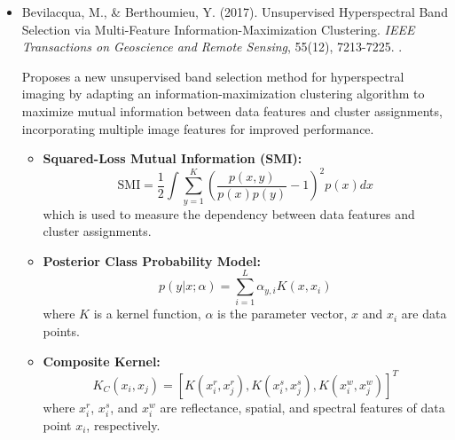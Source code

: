 \documentclass[10pt,svgnames,fragile]{beamer}
\begin{document}
\begin{frame}{}
\tiny
\begin{itemize}

    \item Bevilacqua, M., & Berthoumieu, Y. (2017). Unsupervised Hyperspectral Band Selection via Multi-Feature Information-Maximization Clustering. \textit{IEEE Transactions on Geoscience and Remote Sensing}, 55(12), 7213-7225. \href{https://doi.org/10.1109/IGARSS.2017.8127512}{\color{blue}{DOI: 10.1109/IGARSS.2017.8127512}}. \cite{bevilacquaUnsupervisedHyperspectralBand2017}
    
    {\color{gray}Proposes a new unsupervised band selection method for hyperspectral imaging by adapting an information-maximization clustering algorithm to maximize mutual information between data features and cluster assignments, incorporating multiple image features for improved performance.}
    \begin{itemize} \tiny
    \\item \textbf{Mutual Information Maximization:}
    \[
    \text{MI}(X;Y) = \sum_{x \in X} \sum_{y \in Y} p(x,y) \log \frac{p(x,y)}{p(x)p(y)}
    \]
    where \( X \) and \( Y \) are the random variables representing the data features and cluster assignments, respectively, and \( p \) denotes the probability distributions.

    \item \textbf{Squared-Loss Mutual Information (SMI):}
    \[
    \text{SMI} = \frac{1}{2} \int \sum_{y=1}^{K} \left( \frac{p(x,y)}{p(x)p(y)} - 1 \right)^2 p(x) dx
    \]
    which is used to measure the dependency between data features and cluster assignments.

    \item \textbf{Posterior Class Probability Model:}
    \[
    p(y|x;\alpha) = \sum_{i=1}^{L} \alpha_{y,i} K(x,x_i)
    \]
    where \( K \) is a kernel function, \( \alpha \) is the parameter vector, \( x \) and \( x_i \) are data points.

    \item \textbf{Composite Kernel:}
    \[
    K_C(x_i, x_j) = \left[ K(x_i^r, x_j^r), K(x_i^s, x_j^s), K(x_i^w, x_j^w) \right]^T
    \]
    where \( x_i^r \), \( x_i^s \), and \( x_i^w \) are reflectance, spatial, and spectral features of data point \( x_i \), respectively.
    \end{itemize}
    
\end{itemize}
\end{frame}
\end{document}
